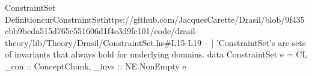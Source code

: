 \begin{haskell}{ConstraintSet Definition}{curConstraintSet}{https://github.com/JacquesCarette/Drasil/blob/9f435cbb9bcda515d765c551606d1f4e3d9fc101/code/drasil-theory/lib/Theory/Drasil/ConstraintSet.hs\#L15-L19}
-- | 'ConstraintSet's are sets of invariants that always hold for underlying domains.
data ConstraintSet e = CL {
    _con  :: ConceptChunk,
    _invs :: NE.NonEmpty e
}
\end{haskell}
